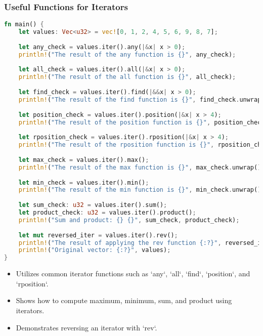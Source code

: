 \documentclass[aspectratio=169, table]{beamer}
\begin{document}
\begin{frame}[fragile]
\frametitle{Useful Functions for Iterators}
\begin{lstlisting}[language=Rust]
fn main() {
	let values: Vec<u32> = vec![0, 1, 2, 4, 5, 6, 9, 8, 7];
	
	let any_check = values.iter().any(|&x| x > 0);
	println!("The result of the any function is {}", any_check);
	
	let all_check = values.iter().all(|&x| x > 0);
	println!("The result of the all function is {}", all_check);
	
	let find_check = values.iter().find(|&&x| x > 0);
	println!("The result of the find function is {}", find_check.unwrap());
	
	let position_check = values.iter().position(|&x| x > 4);
	println!("The result of the position function is {}", position_check.unwrap());
	
	let rposition_check = values.iter().rposition(|&x| x > 4);
	println!("The result of the rposition function is {}", rposition_check.unwrap());
	
	let max_check = values.iter().max();
	println!("The result of the max function is {}", max_check.unwrap());
	
	let min_check = values.iter().min();
	println!("The result of the min function is {}", min_check.unwrap());
	
	let sum_check: u32 = values.iter().sum();
	let product_check: u32 = values.iter().product(); 
	println!("Sum and product: {} {}", sum_check, product_check);
	
	let mut reversed_iter = values.iter().rev();
	println!("The result of applying the rev function {:?}", reversed_iter.collect::<Vec<_>>());
	println!("Original vector: {:?}", values);
}
\end{lstlisting}
\begin{itemize}
\item Utilizes common iterator functions such as `any`, `all`, `find`, `position`, and `rposition`.
\item Shows how to compute maximum, minimum, sum, and product using iterators.
\item Demonstrates reversing an iterator with `rev`.
\end{itemize}
\end{frame}
\end{document}
